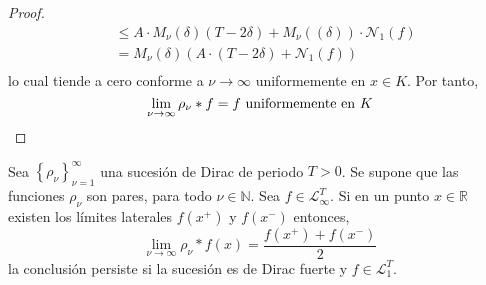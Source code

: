 \documentclass[12pt]{report}
\theoremstyle{largebreak}
\newcommand{\N}[2]{\ensuremath{\mathcal{N}_{#1}\left(#2\right)}}
\begin{document}
\begin{proof}
\begin{equation*}
\begin{split}
                &\leq A\cdot M_\nu(\delta)(T-2\delta)+M_\nu((\delta))\cdot\N{1}{f}\\
                &= M_\nu(\delta)\left(A\cdot (T-2\delta)+\N{1}{f} \right)\\
            \end{split}
        \end{equation*}
        lo cual tiende a cero conforme a $\nu\rightarrow\infty$ uniformemente en $x\in K$. Por tanto,
        \begin{equation*}
            \lim_{\nu\rightarrow\infty}\rho_\nu*f=f\textup{ uniformemente en }K
        \end{equation*}
    \end{proof}

    \begin{propo}
        Sea $\left\{\rho_\nu \right\}_{\nu=1}^\infty$ una sucesión de Dirac de periodo $T>0$. Se supone que las funciones $\rho_\nu$ son pares, para todo $\nu\in\mathbb{N}$. Sea $f\in\mathcal{L}_{\infty}^T$. Si en un punto $x\in\mathbb{R}$ existen los límites laterales $f(x^+)$ y $f(x^-)$ entonces,
        \begin{equation*}
            \lim_{\nu\rightarrow\infty}\rho_\nu*f(x)=\frac{f(x^+)+f(x^-)}{2}
        \end{equation*}
        la conclusión persiste si la sucesión es de Dirac fuerte y $f\in\mathcal{L}_1^T$.
    \end{propo}
\end{document}

